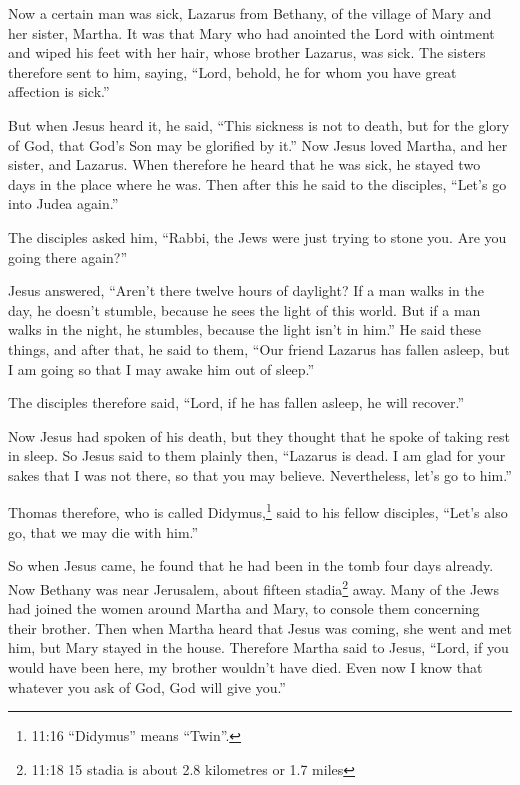  Now a certain man was sick, Lazarus from Bethany, of the
village of Mary and her sister, Martha.  It was that Mary
who had anointed the Lord with ointment and wiped his feet with her
hair, whose brother Lazarus, was sick.  The sisters
therefore sent to him, saying, ``Lord, behold, he for whom you have
great affection is sick.''

 But when Jesus heard it, he said, ``This sickness is not to
death, but for the glory of God, that God's Son may be glorified by
it.''  Now Jesus loved Martha, and her sister, and Lazarus.
 When therefore he heard that he was sick, he stayed two
days in the place where he was.  Then after this he said to
the disciples, ``Let's go into Judea again.''

 The disciples asked him, ``Rabbi, the Jews were just trying
to stone you. Are you going there again?''

 Jesus answered, ``Aren't there twelve hours of daylight? If
a man walks in the day, he doesn't stumble, because he sees the light of
this world.  But if a man walks in the night, he stumbles,
because the light isn't in him.''  He said these things,
and after that, he said to them, ``Our friend Lazarus has fallen asleep,
but I am going so that I may awake him out of sleep.''

 The disciples therefore said, ``Lord, if he has fallen
asleep, he will recover.''

 Now Jesus had spoken of his death, but they thought that
he spoke of taking rest in sleep.  So Jesus said to them
plainly then, ``Lazarus is dead.  I am glad for your sakes
that I was not there, so that you may believe. Nevertheless, let's go to
him.''

 Thomas therefore, who is called Didymus,\footnote{11:16
  ``Didymus'' means ``Twin''.} said to his fellow disciples, ``Let's
also go, that we may die with him.''

 So when Jesus came, he found that he had been in the tomb
four days already.  Now Bethany was near Jerusalem, about
fifteen stadia\footnote{11:18 15 stadia is about 2.8 kilometres or 1.7
  miles} away.  Many of the Jews had joined the women
around Martha and Mary, to console them concerning their brother.
 Then when Martha heard that Jesus was coming, she went and
met him, but Mary stayed in the house.  Therefore Martha
said to Jesus, ``Lord, if you would have been here, my brother wouldn't
have died.  Even now I know that whatever you ask of God,
God will give you.''

